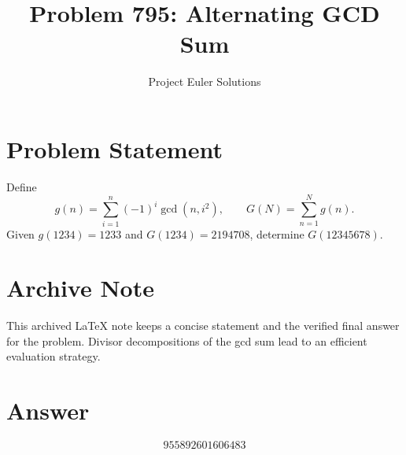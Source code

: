 \documentclass[11pt]{article}
\title{Problem 795: Alternating GCD Sum}
\author{Project Euler Solutions}
\date{}
\begin{document}
\maketitle

\section{Problem Statement}
Define
\[
g(n)=\sum_{i=1}^{n} (-1)^i \gcd(n,i^2),
\qquad
G(N)=\sum_{n=1}^{N} g(n).
\]
Given $g(1234)=1233$ and $G(1234)=2194708$, determine $G(12345678)$.

\section{Archive Note}
This archived LaTeX note keeps a concise statement and the verified final answer for the problem. Divisor decompositions of the gcd sum lead to an efficient evaluation strategy.

\section{Answer}

\[
\boxed{955892601606483}
\]
\end{document}
